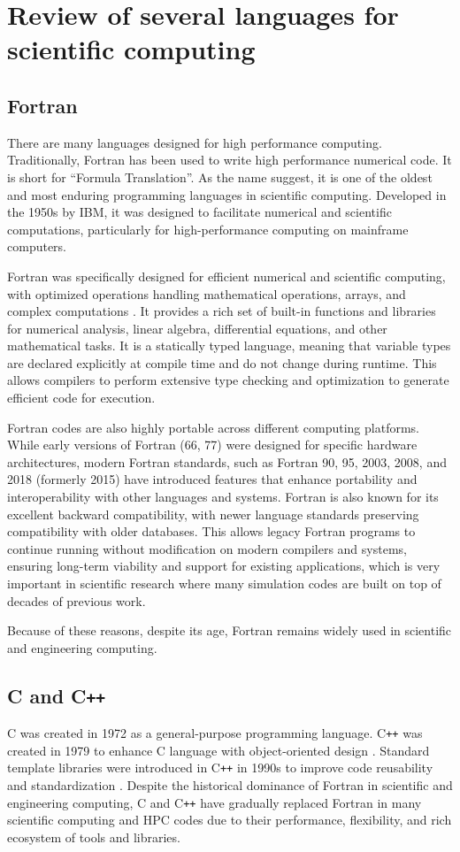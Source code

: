 \section{Review of several languages for scientific computing}
\subsection{Fortran}
There are many languages designed for high performance computing.
Traditionally, Fortran has been used to write high performance numerical code.
It is short for ``Formula Translation''. As the name suggest, it is one of the oldest and most enduring programming languages in scientific computing.
Developed in the 1950s by IBM, it was designed to facilitate numerical and scientific computations, particularly for high-performance computing on mainframe computers.

Fortran was specifically designed for efficient numerical and scientific computing, with optimized operations handling mathematical operations, arrays, and complex computations \citep{10.1145/960118.808380}.
It provides a rich set of built-in functions and libraries for numerical analysis, linear algebra, differential equations, and other mathematical tasks.
It is a statically typed language, meaning that variable types are declared explicitly at compile time and do not change during runtime. This allows compilers to perform extensive type checking and optimization to generate efficient code for execution.

Fortran codes are also highly portable across different computing platforms. While early versions of Fortran (66, 77) were designed for specific hardware architectures, modern Fortran standards, such as Fortran 90, 95, 2003, 2008, and 2018 (formerly 2015) have introduced features that enhance portability and interoperability with other languages and systems. Fortran is also known for its excellent backward compatibility, with newer language standards preserving compatibility with older databases.
This allows legacy Fortran programs to continue running without modification on modern compilers and systems, ensuring long-term viability and support for existing applications, which is very important in scientific research where many simulation codes are built on top of decades of previous work.

Because of these reasons, despite its age, Fortran remains widely used in scientific and engineering computing.

\subsection{C and C\texttt{++}}
C was created in 1972 as a general-purpose programming language. C\texttt{++} was created in 1979 to enhance C language with object-oriented design \citep{10.1145/323648.323736}.
Standard template libraries were introduced in C\texttt{++} in 1990s to improve code reusability and standardization \citep{10.5555/2544010}.
Despite the historical dominance of Fortran in scientific and engineering computing, C and C\texttt{++} have gradually replaced Fortran in many scientific computing and HPC codes due to their performance, flexibility, and rich ecosystem of tools and libraries.

